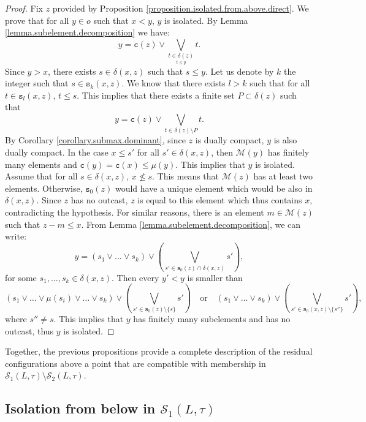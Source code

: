 \documentclass{article}
\begin{document}
\begin{proof}
    Fix $z$ provided by Proposition \ref{proposition.isolated.from.above.direct}. We prove that for all $y \in o$ such that $x < y$, $y$ is isolated. By Lemma \ref{lemma.subelement.decomposition} we have: 
\[y = \texttt{c}(z) \vee \bigvee_{\underset{t \le y}{t \in \delta(z)}} t.\]
    Since $y > x$, there exists $s \in \delta(x,z)$ such that $s \le y$. Let us denote by $k$ the integer such that $s \in \texttt{s}_k (x,z)$. We know that there exists $l>k$ such that for all $t \in \texttt{s}_{l}(x,z)$, $t \le s$. This implies that there exists a finite set $P \subset \delta(z)$ such that 
    \[y = \texttt{c}(z) \vee \bigvee_{{t \in \delta(z) \setminus P}} t.\]
    By Corollary \ref{corollary.submax.dominant}, since $z$ is dually compact, $y$ is also dually compact.
    In the case $x \le s'$ for all $s' \in \delta(x,z)$, then $\mathcal{M}(y)$ has finitely many elements and $\texttt{c}(y) = \texttt{c}(x) \le \mu(y)$. This implies that $y$ is isolated. Assume that for all $s \in \delta(x,z)$, $x \not \le s$. This means that $\mathcal{M}(z)$ has at least two elements. Otherwise, $\texttt{s}_{0}(z)$ would have a unique element which would be also in $\delta(x,z)$. Since $z$ has no outcast, $z$ is equal to this element which thus contains $x$, contradicting the hypothesis. For similar reasons, there is an element $m \in \mathcal{M}(z)$ such that $z-m \le x$. 
    From Lemma \ref{lemma.subelement.decomposition}, we can write: 
     \[y = (s_1 \vee \ldots \vee s_k) \vee \left(\bigvee_{s' \in \texttt{s}_0(z) \cap \delta(x,z)} s' \right),\]
     for some $s_1, \ldots , s_k \in \delta(x,z)$. 
     Then every $y' < y$ is smaller than 
     \[(s_1 \vee \ldots \vee \mu(s_i) \vee \ldots \vee s_k)  \vee \left(\bigvee_{s' \in \texttt{s}_0(z) \setminus \{s\}} s' \right) \quad \text{or} \quad (s_1 \vee \ldots \vee s_k) \vee \left(\bigvee_{s' \in \texttt{s}_0(x,z) \setminus \{s''\}} s' \right),\]
     where $s'' \neq s$. This implies that $y$ has finitely many subelements and has no outcast, thus $y$ is isolated.
\end{proof}

{
Together, the previous propositions provide a complete description of the residual configurations above a point that are compatible with membership in \(\mathcal S_1(L,\tau)\setminus\mathcal S_2(L,\tau)\).
}



%
%
%

\subsection{Isolation from below in $\mathcal{S}_1(L,\tau)$\label{section.isolated.from.below}}
\end{document}
